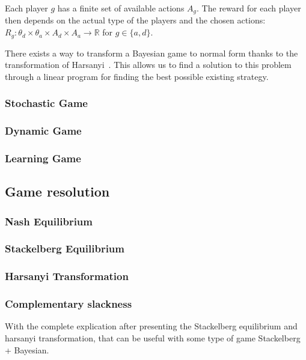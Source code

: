 Each player $g$ has a finite set of available actions $A_g$. The reward for each player then depends on the actual type of the players and the chosen actions:  $R_g : \theta_d \times \theta_a \times A_d \times A_a \rightarrow \mathbb{R}$ for $g \in \{a,d\}$.

There exists a way to transform a Bayesian game to normal form thanks to the transformation of Harsanyi~\cite{harsanyi_generalized_1972}. This allows us to find a solution to this problem through a linear program for finding the best possible existing strategy. 


\subsubsection{Stochastic Game}

\subsubsection{Dynamic Game}

\subsubsection{Learning Game}


\subsection{Game resolution}

\subsubsection{Nash Equilibrium}

\subsubsection{Stackelberg Equilibrium}

\subsubsection{Harsanyi Transformation }

\subsubsection{Complementary slackness}

With the complete explication after presenting the Stackelberg equilibrium and harsanyi transformation, that can be useful with some type of game Stackelberg + Bayesian.


